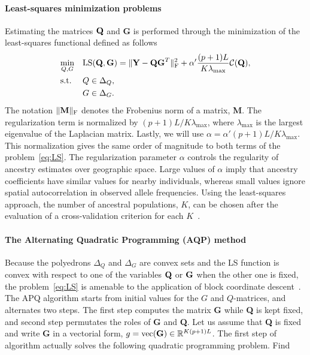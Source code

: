\paragraph{Least-squares minimization problems} Estimating the matrices ${\bf Q}$ and {\bf G } is performed through the minimization of the least-squares functional defined as follows~\citep{Caye2016}
\begin{equation}
\begin{aligned}
& \underset{Q, G}{\text{min}}
& & {\rm LS}({\bf Q}, {\bf G}) =   \|  {\bf Y} - {\bf QG}^T \|^2_{\rm F} +  \alpha ' \frac{(p+1)L}{K \lambda_{\max}} {\cal C}({\bf Q}) , \\
& \text{s.t.} & &  Q \in \Delta_Q , \\
& & &  G \in \Delta_G . \\
\end{aligned}
\label{eq:LS}
\end{equation}
 \noindent The notation $\|  {\bf M}  \|_{\rm F}$ denotes the Frobenius norm of a matrix, {\bf M}. The regularization term is normalized by $(p+1)L/K \lambda_{\max}$, where $\lambda_{\max}$ is the largest eigenvalue of the Laplacian matrix. Lastly, we will use $\alpha = \alpha ' (p+1)L/K \lambda_{\max}$. This normalization gives the same order of magnitude to both terms of the problem~\ref{eq:LS}. The regularization parameter $\alpha$ controls the regularity of ancestry estimates over geographic space.  Large values of $\alpha$ imply that ancestry coefficients have similar values for nearby individuals, whereas small values ignore spatial autocorrelation in observed allele frequencies. Using the least-squares approach, the number of ancestral populations, $K$, can be chosen after the evaluation of a cross-validation criterion for each $K$~\citep{Alexander2011, Frichot2014, Frichot2015}.


\paragraph{The Alternating Quadratic Programming (AQP) method} Because the poly\-edrons $\Delta_Q$ and  $\Delta_G$ are convex sets and the LS function is convex with
respect to one of the variables ${\bf Q}$ or ${\bf G}$ when the other one is fixed, the problem~\ref{eq:LS} is amenable to the application of block coordinate descent~\citep{Bertsekas1995}. The APQ algorithm starts from initial values for the $G$ and $Q$-matrices, and alternates two steps. The first step computes the matrix {\bf G} while  {\bf Q} is kept fixed, and second step permutates the roles of {\bf G} and {\bf Q}.  Let us assume that {\bf Q} is fixed and write {\bf G} in a vectorial form, $g = {\rm vec({\bf G})} \in \mathbb{R}^{K(p + 1)L}$. The first step of algorithm actually solves the following quadratic programming problem. Find  

